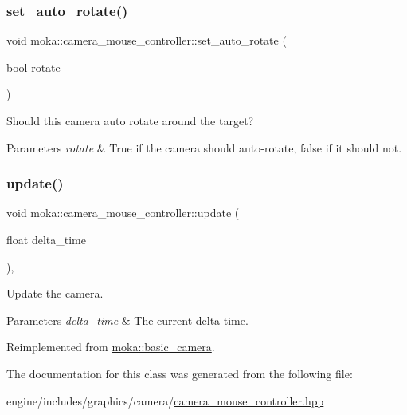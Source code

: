 \mbox{\label{classmoka_1_1camera__mouse__controller_ab46814bbaba3bbbfad0337566fab052a}} 
\subsubsection{\texorpdfstring{set\_auto\_rotate()}{set\_auto\_rotate()}}
{\footnotesize\ttfamily void moka\+::camera\+\_\+mouse\+\_\+controller\+::set\+\_\+auto\+\_\+rotate (\begin{DoxyParamCaption}\item[{bool}]{rotate }\end{DoxyParamCaption})}



Should this camera auto rotate around the target? 


\begin{DoxyParams}{Parameters}
{\em rotate} & True if the camera should auto-\/rotate, false if it should not. \\
\hline
\end{DoxyParams}
\mbox{\label{classmoka_1_1camera__mouse__controller_a088d8d1f491895f394e67253d4ee4a76}} 
\subsubsection{\texorpdfstring{update()}{update()}}
{\footnotesize\ttfamily void moka\+::camera\+\_\+mouse\+\_\+controller\+::update (\begin{DoxyParamCaption}\item[{float}]{delta\+\_\+time }\end{DoxyParamCaption})\hspace{0.3cm}{\ttfamily [override]}, {\ttfamily [virtual]}}



Update the camera. 


\begin{DoxyParams}{Parameters}
{\em delta\+\_\+time} & The current delta-\/time. \\
\hline
\end{DoxyParams}


Reimplemented from \mbox{\hyperlink{classmoka_1_1basic__camera_a43891fadfe629d3306c3863255660556}{moka\+::basic\+\_\+camera}}.



The documentation for this class was generated from the following file\+:\begin{DoxyCompactItemize}
\item 
engine/includes/graphics/camera/\mbox{\hyperlink{camera__mouse__controller_8hpp}{camera\+\_\+mouse\+\_\+controller.\+hpp}}\end{DoxyCompactItemize}
